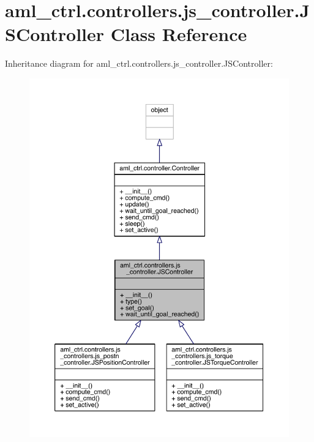 \hypertarget{classaml__ctrl_1_1controllers_1_1js__controller_1_1_j_s_controller}{}\section{aml\+\_\+ctrl.\+controllers.\+js\+\_\+controller.\+J\+S\+Controller Class Reference}
\label{classaml__ctrl_1_1controllers_1_1js__controller_1_1_j_s_controller}


Inheritance diagram for aml\+\_\+ctrl.\+controllers.\+js\+\_\+controller.\+J\+S\+Controller\+:\nopagebreak
\begin{figure}[H]
\begin{center}
\leavevmode
\includegraphics[width=350pt]{classaml__ctrl_1_1controllers_1_1js__controller_1_1_j_s_controller__inherit__graph}
\end{center}
\end{figure}


